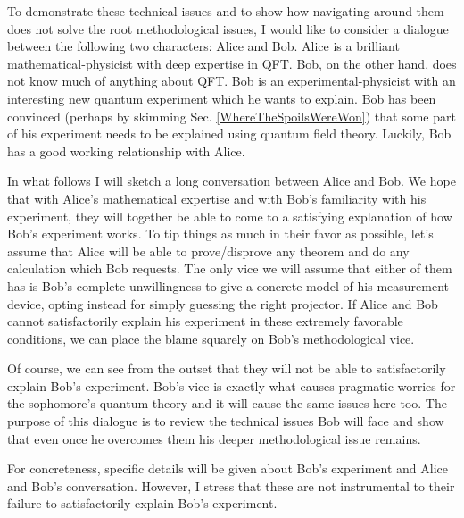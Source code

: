 \documentclass[prd,twocolumn,superscriptaddress,floatfix,amsmath,amssymb,amsfonts,nofootinbib]{revtex4-2}
\begin{document}
To demonstrate these technical issues and to show how navigating around them does not solve the root methodological issues, I would like to consider a dialogue between the following two characters: Alice and Bob. Alice is a brilliant mathematical-physicist with deep expertise in QFT. Bob, on the other hand, does not know much of anything about QFT. Bob is an experimental-physicist with an interesting new quantum experiment which he wants to explain. Bob has been convinced (perhaps by skimming Sec. \ref{WhereTheSpoilsWereWon}) that some part of his experiment needs to be explained using quantum field theory. Luckily, Bob has a good working relationship with Alice.

In what follows I will sketch a long conversation between Alice and Bob. We hope that with Alice's mathematical expertise and with Bob's familiarity with his experiment, they will together be able to come to a satisfying explanation of how Bob's experiment works. To tip things as much in their favor as possible, let's assume that Alice will be able to prove/disprove any theorem and do any calculation which Bob requests. The only vice we will assume that either of them has is Bob's complete unwillingness to give a concrete model of his measurement device, opting instead for simply guessing the right projector. If Alice and Bob cannot satisfactorily explain his experiment in these extremely favorable conditions, we can place the blame squarely on Bob's methodological vice.

Of course, we can see from the outset that they will not be able to satisfactorily explain Bob's experiment. Bob's vice is exactly what causes pragmatic worries for the sophomore's quantum theory and it will cause the same issues here too. The purpose of this dialogue is to review the technical issues Bob will face and show that even once he overcomes them his deeper methodological issue remains.

For concreteness, specific details will be given about Bob's experiment and Alice and Bob's conversation. However, I stress that these are not instrumental to their failure to satisfactorily explain Bob's experiment.

\end{document}
